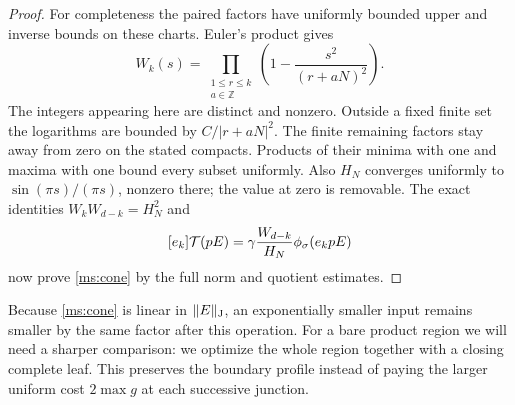 \begin{proof}
For completeness the paired factors have uniformly bounded upper
and inverse bounds on these charts. Euler's product gives
\begin{equation}\label{ms:subset-product}
 W_k(s)=\prod_{\substack{1\le r\le k\\a\in\mathbb Z}}
             \left(1-\frac{s^2}{(r+aN)^2}\right).
\end{equation}
The integers appearing here are distinct and nonzero. Outside a
fixed finite set the logarithms are bounded by $C/|r+aN|^2$.
The finite remaining factors stay away from zero on the stated
compacts. Products of their minima with one and maxima with one
bound every subset uniformly. Also $H_N$ converges uniformly to
$\sin(\pi s)/(\pi s)$, nonzero there; the value at zero is removable.
The exact identities $W_kW_{d-k}=H_N^2$ and
\begin{equation}\label{ms:turned-probe}
 [e_k]\mathcal T(pE)=\gamma\frac{W_{d-k}}{H_N}
                      \phi_\sigma(e_kpE)
\end{equation}
now prove \eqref{ms:cone} by the full norm and quotient estimates.
\end{proof}

Because \eqref{ms:cone} is linear in $\lVert E\rVert_{\mathrm J}$, an exponentially
smaller input remains smaller by the same factor after this operation.
For a bare product region we will need a sharper comparison: we
optimize the whole region together with a closing complete leaf. This
preserves the boundary profile instead of paying the larger uniform
cost $2\max g$ at each successive junction.
